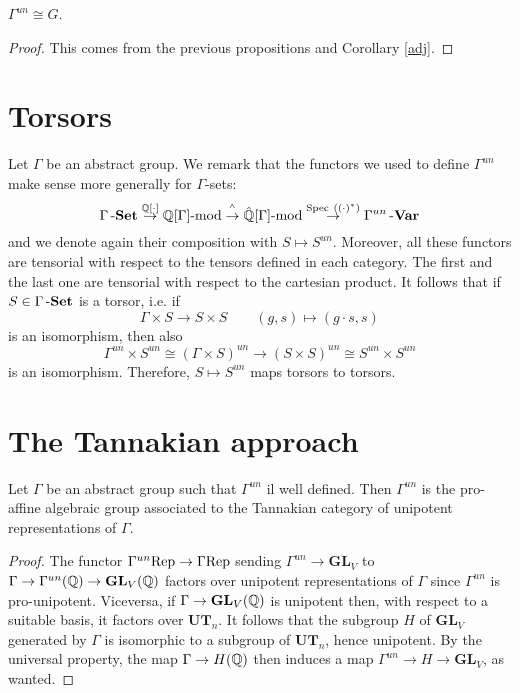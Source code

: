 \begin{cor}
$\Gamma^{un}\cong G$.
\end{cor}

\begin{proof}
This comes from the previous propositions and Corollary \ref{adj}.
\end{proof}

\section{Torsors}

Let $\Gamma$ be an abstract group. We remark that the functors we used to define $\Gamma^{un}$ make sense more generally for $\Gamma$-sets:
\[
\Gamma\operatorname{\bf{-Set}}\stackrel{\mathbb{Q}[\cdot]}{\rightarrow}\mathbb{Q}[\Gamma]\text{-}\mathrm{mod}\stackrel{^\wedge}{\rightarrow}\hat{\mathbb{Q}}[\Gamma]\text{-}\mathrm{mod}\stackrel{\mathrm{Spec}~((\cdot)^*)}{\rightarrow}\Gamma^{un}\operatorname{\bf{-Var}}
\]
and we denote again their composition with $S\mapsto S^{un}$.
Moreover, all these functors are tensorial with respect to the tensors defined in each category. The first and the last one are tensorial with respect to the cartesian product. It follows that if $S\in\Gamma\operatorname{\bf{-Set}}$ is a torsor, i.e. if 
\[\Gamma\times S\to S\times S\qquad (g,s)\mapsto (g\cdot s,s)\]
is an isomorphism, then also
\[\Gamma^{un}\times S^{un}\cong(\Gamma\times S)^{un}\to (S\times S)^{un}\cong S^{un}\times S^{un}\]
is an isomorphism. Therefore, $S\mapsto S^{un}$ maps torsors to torsors.


\section{The Tannakian approach}

\begin{prop}
Let $\Gamma$ be an abstract group such that $\Gamma^{un}$ il well defined. Then $\Gamma^{un}$ is the pro-affine algebraic group associated to the Tannakian category of unipotent representations of $\Gamma$.
\end{prop}

\begin{proof}
The functor $\Gamma^{un}\mathrm{Rep}\to\Gamma \mathrm{Rep}$ sending $\Gamma^{un}\to\mathbf{GL}_V$ to $\Gamma\to\Gamma^{un}(\mathbb{Q})\to\mathbf{GL}_V(\mathbb{Q})$ factors over unipotent representations of $\Gamma$ since $\Gamma^{un}$ is pro-unipotent. Viceversa, if $\Gamma\to\mathbf{GL}_V(\mathbb{Q})$ is unipotent then, with respect to a suitable basis, it factors over $\mathbf{UT}_n$. It follows that the subgroup $H$ of $\mathbf{GL}_V$ generated by $\Gamma$ is isomorphic to a subgroup of $\mathbf{UT}_n$, hence unipotent. By the universal property, the map $\Gamma\to H(\mathbb{Q})$ then induces a map $\Gamma^{un}\to H\to\mathbf{GL}_V$, as wanted.
\end{proof}

